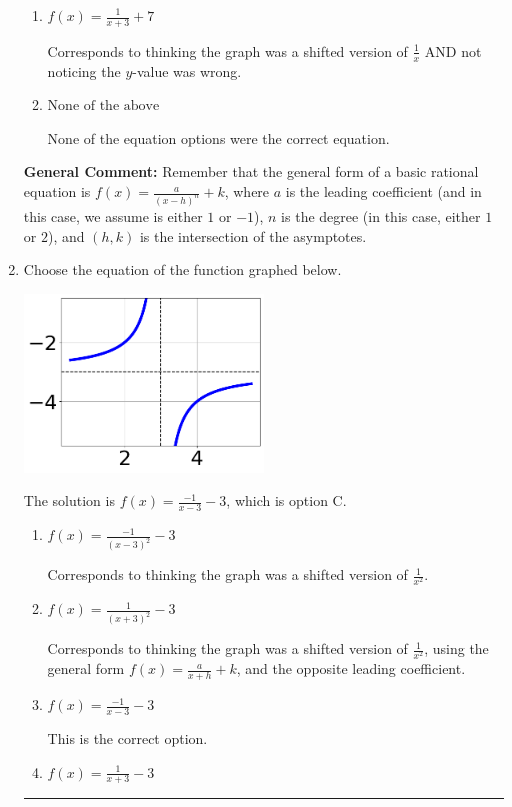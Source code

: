 \documentclass{extbook}[14pt]
\newcommand{\litem}[1]{\item #1

\rule{\textwidth}{0.4pt}}
\begin{document}
\begin{enumerate}
{\begin{enumerate}[label=\Alph*.]
Corresponds to using the general form $f(x) = \frac{a}{(x-h)^2}+k$, the opposite leading coefficient, AND not noticing the $y$-value was wrong.
\item \( f(x) = \frac{1}{x + 3} + 7 \)

Corresponds to thinking the graph was a shifted version of $\frac{1}{x}$ AND not noticing the $y$-value was wrong.
\item \( \text{None of the above} \)

None of the equation options were the correct equation.
\end{enumerate}

\textbf{General Comment:} Remember that the general form of a basic rational equation is $ f(x) = \frac{a}{(x-h)^n} + k$, where $a$ is the leading coefficient (and in this case, we assume is either $1$ or $-1$), $n$ is the degree (in this case, either $1$ or $2$), and $(h, k)$ is the intersection of the asymptotes.
}
\litem{
Choose the equation of the function graphed below.

\begin{center}
    \includegraphics[width=0.5\textwidth]{../Figures/rationalGraphToEquationCopyA.png}
\end{center}


The solution is \( f(x) = \frac{-1}{x - 3} - 3 \), which is option C.\begin{enumerate}[label=\Alph*.]
\item \( f(x) = \frac{-1}{(x - 3)^2} - 3 \)

Corresponds to thinking the graph was a shifted version of $\frac{1}{x^2}$.
\item \( f(x) = \frac{1}{(x + 3)^2} - 3 \)

Corresponds to thinking the graph was a shifted version of $\frac{1}{x^2}$, using the general form $f(x) = \frac{a}{x+h}+k$, and the opposite leading coefficient.
\item \( f(x) = \frac{-1}{x - 3} - 3 \)

This is the correct option.
\item \( f(x) = \frac{1}{x + 3} - 3 \)


\end{enumerate}}
\end{enumerate}
\end{document}
